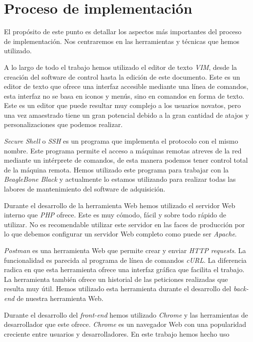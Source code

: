 \chapter{Proceso de implementación}
	El propósito de este punto es detallar los aspectos más importantes del proceso de implementación. Nos centraremos en las herramientas y
	técnicas que hemos utilizado.
	\par
	A lo largo de todo el trabajo hemos utilizado el editor de texto \emph{VIM}\cite{vim}, desde la creación del software de control hasta la edición de
	este documento. Este es un editor de texto que ofrece una interfaz accesible mediante una línea de comandos, esta interfaz no se basa en iconos
	y menús, sino en comandos en forma de texto. Este es un editor que puede resultar muy complejo a los usuarios novatos, pero una vez amaestrado
	tiene un gran potencial debido a la gran cantidad de atajos y personalizaciones que podemos realizar.
	\par
	\emph{Secure Shell} o \emph{SSH}\cite{ssh} es un programa que implementa el protocolo con el mismo nombre. Este programa permite el acceso a máquinas
	remotas atreves de  la red mediante un intérprete de comandos, de esta manera podemos tener control total de la máquina remota. Hemos
	utilizado este programa para trabajar con la \emph{BeagleBone Black} y actualmente lo estamos utilizando para realizar todas las labores de
	mantenimiento del software de adquisición.
	\par
	Durante el desarrollo de la herramienta Web hemos utilizado el servidor Web interno que \emph{PHP} ofrece. Este es muy cómodo, fácil y sobre todo
	rápido de utilizar. No es recomendable utilizar este servidor en las faces de producción por lo que debemos configurar un servidor Web
	completo como puede ser \emph{Apache}\cite{Apache}.
	\par
	\emph{Postman}\cite{Postman} es una herramienta Web que permite crear y enviar \emph{HTTP requests}. La funcionalidad es parecida al programa de
	línea de comandos \emph{cURL}. La diferencia radica en que esta herramienta ofrece una interfaz gráfica que facilita el trabajo. La herramienta
	también ofrece un historial de las peticiones realizadas que resulta muy útil. Hemos utilizado esta herramienta durante el desarrollo del
	\emph{back-end} de nuestra herramienta Web.
	\par
	Durante el desarrollo del \emph{front-end} hemos utilizado \emph{Chrome} y las herramientas de desarrollador que este ofrece\cite{ChromeDev}.
	\emph{Chrome} es un navegador Web con una popularidad creciente entre usuarios y desarrolladores. En este trabajo hemos hecho uso
